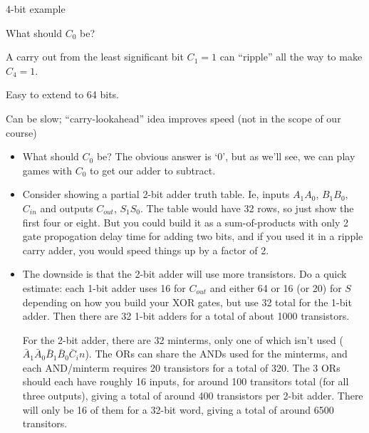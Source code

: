 \begin{frame}[fragile]
\begin{itemize}
\item 4-bit example


 \begin{tcolorbox}[enhanced,attach boxed title to top center={yshift=-3mm,yshifttext=-1mm},
  colback=blue!5!white,colframe=blue!75!black,colbacktitle=blue!80!black,
  title=Think About It,fonttitle=\bfseries,
  boxed title style={size=small,colframe=red!50!black} ]
What should $C_0$ be?
  \end{tcolorbox}
  {\footnotesize
\item A carry out from the least significant bit $C_1=1$ can ``ripple'' all the way to make $C_4=1$.
\item Easy to extend to 64 bits.
\item Can be slow; ``carry-lookahead'' idea improves speed {\footnotesize (not in the scope of our course)}
}
\end{itemize}
\BNotes\ifnum{}
\begin{itemize}
\item What should $C_{0}$ be?  The obvious answer is `0', but as we'll see,
	we can play games with $C_0$ to get our adder to subtract.
\item
	Consider showing a partial 2-bit adder truth table.
	Ie, inputs $A_1A_0$, $B_1B_0$, $C_{in}$ and outputs
	$C_{out}$, $S_1S_0$.  The table would have 32 rows, so just
	show the first four or eight.  But you could build it as a
	sum-of-products with only 2 gate propogation delay time for
	adding two bits, and if you used it in a ripple carry adder,
	you would speed things up by a factor of 2.
\item The downside is that the 2-bit adder will use more
	transistors.  Do a quick estimate: each 1-bit adder uses 16 for
	$C_{out}$ and either 64 or 16 (or 20) for $S$ depending on how
	you build your XOR gates, but use 32 total for the 1-bit adder.
	Then there are 32 1-bit adders for a total of about 1000 transistors.

	{\small
	For the 2-bit adder, there are 32 minterms, only one of which isn't
	used ($\bar{A}_1\bar{A}_0\bar{B}_1\bar{B}_0\bar{C}_in$).  The ORs
	can share the ANDs used for the minterms, and each AND/minterm requires
	20 transistors for a total of 320.  The 3 ORs should each have roughly 
	16 inputs, for around 100 transitors total (for all three outputs),
	giving a total of around 400 transistors per 2-bit 
	adder.  There will only be 16 of them for a 32-bit word, giving a
	total of around 6500 transitors.

}
\end{itemize}
\end{frame}
